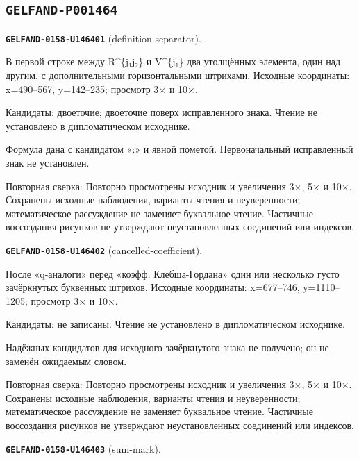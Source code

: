 \subsection*{\texttt{GELFAND-P001464}}
\par\noindent\leavevmode{}\label{GELFAND-0158-U146401}\label{GELFAND-P001464:definition-separator}\textbf{\texttt{GELFAND-0158-U146401}} (definition-separator).\nopagebreak[4]\par
В первой строке между R\textasciicircum{}\{j₁j₂\} и V\textasciicircum{}\{j₁\} два утолщённых элемента, один над другим, с дополнительными горизонтальными штрихами. Исходные координаты: x=490–567, y=142–235; просмотр 3× и 10×.\par
Кандидаты: двоеточие; двоеточие поверх исправленного знака. Чтение не установлено в дипломатическом исходнике.\par
Формула дана с кандидатом «:» и явной пометой. Первоначальный исправленный знак не установлен.\par
Повторная сверка: Повторно просмотрены исходник и увеличения 3×, 5× и 10×. Сохранены исходные наблюдения, варианты чтения и неуверенности; математическое рассуждение не заменяет буквальное чтение. Частичные воссоздания рисунков не утверждают неустановленных соединений или индексов.\par\medskip
\par\noindent\leavevmode{}\label{GELFAND-0158-U146402}\label{GELFAND-P001464:cancelled-coefficient}\textbf{\texttt{GELFAND-0158-U146402}} (cancelled-coefficient).\nopagebreak[4]\par
После «q-аналоги» перед «коэфф. Клебша-Гордана» один или несколько густо зачёркнутых буквенных штрихов. Исходные координаты: x=677–746, y=1110–1205; просмотр 3× и 10×.\par
Кандидаты: не записаны. Чтение не установлено в дипломатическом исходнике.\par
Надёжных кандидатов для исходного зачёркнутого знака не получено; он не заменён ожидаемым словом.\par
Повторная сверка: Повторно просмотрены исходник и увеличения 3×, 5× и 10×. Сохранены исходные наблюдения, варианты чтения и неуверенности; математическое рассуждение не заменяет буквальное чтение. Частичные воссоздания рисунков не утверждают неустановленных соединений или индексов.\par\medskip
\par\noindent\leavevmode{}\label{GELFAND-0158-U146403}\label{GELFAND-P001464:sum-mark}\textbf{\texttt{GELFAND-0158-U146403}} (sum-mark).\nopagebreak[4]\par
